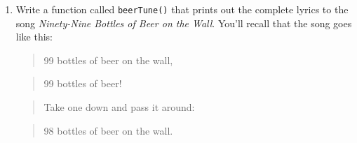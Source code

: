 \documentclass[]{book}
\providecommand{\tightlist}{%
  \setlength{\itemsep}{0pt}\setlength{\parskip}{0pt}}
\theoremstyle{definition}
\theoremstyle{definition}
\theoremstyle{definition}
\theoremstyle{remark}
\begin{document}
{\begin{enumerate}
  \begin{itemize}
  \tightlist
  \item
    a line with just one \(x\),
  \item
    another line with two \(x\)'s,
  \item
    another line with three \(x\)'s,
  \item
    and so on until \ldots{}
  \item
    a line with \(n\) \(x\)'s, and then
  \item
    another line with \(n-1\) \(x\)'s,
  \item
    and so on until \ldots{}
  \item
    a line with just one \(x\).
  \end{itemize}

  Thus when the character is \texttt{*} and \texttt{n} is 5, the output
  would look like this:

\begin{verbatim}
## *
## **
## ***
## ****
## *****
## ****
## ***
## **
## *
\end{verbatim}

  The function should take two arguments:

  \begin{itemize}
  \tightlist
  \item
    \texttt{char}: the character to repeat. The default value should be
    \texttt{"*"}.
  \item
    \texttt{n}: the number of characters in the longest, middle line.
    The default value should be 3.
  \end{itemize}
\item
  Write a function called \texttt{beerTune()} that prints out the
  complete lyrics to the song \emph{Ninety-Nine Bottles of Beer on the
  Wall}. You'll recall that the song goes like this:

  \begin{quote}
  99 bottles of beer on the wall,
  \end{quote}

  \begin{quote}
  99 bottles of beer!
  \end{quote}

  \begin{quote}
  Take one down and pass it around:
  \end{quote}

  \begin{quote}
  98 bottles of beer on the wall.
  \end{quote}


\end{enumerate}}
\end{document}
